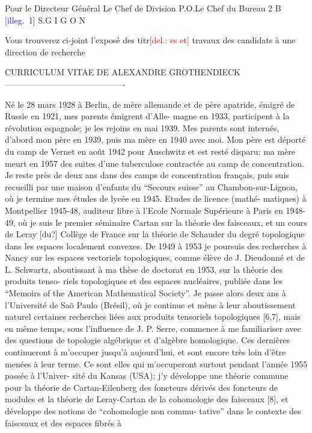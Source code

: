 \documentclass[11pt]{article}
\newcommand{\scanpage}[1]{\par\bigskip\noindent{\small\sffamily[scan #1]}\par}
\newcommand{\mspage}[1]{{\small\sffamily[p.\,#1]}}
\newcommand{\hand}[1]{\textcolor{blue}{#1}}
\newcommand{\deleted}[1]{\textcolor{red}{[\textsf{del.:} #1]}}
\newcommand{\unsure}[1]{[#1?]}
\newcommand{\illegible}[1]{[\textsf{illeg.\ #1}]}
\begin{document}
Pour le Directeur Général
Le Chef de Division
P.O.Le Chef du Bureau 2 B
\hand{\illegible{1}}
S.G I G O N

\mspage{\hand{308}}

\clearpage
\scanpage{119/310}
Vous trouverez ci-joint l'exposé
des titr\deleted{es et} travaux des candidats
à une direction de recherche

CURRICULUM VITAE DE ALEXANDRE GROTHENDIECK
-------------------------------------------

Né le 28 mars 1928 à Berlin, de mère allemande et de père
apatride, émigré de Russie en 1921, mes parents émigrent d'Alle-%
magne en 1933, participent à la révolution espagnole; je les
rejoins en mai 1939. Mes parents sont internés, d'abord mon père
en 1939, puis ma mère en 1940 avec moi. Mon père est déporté du
camp de Vernet en août 1942 pour Auschwitz et est resté disparu;
ma mère meurt en 1957 des suites d'une tuberculose contractée au
camp de concentration. Je reste près de deux ans dans des camps
de concentration français, puis suis recueilli par une maison
d'enfants du ``Secours suisse'' au Chambon-sur-Lignon, où je
termine mes études de lycée en 1945. Etudes de licence (mathé-%
matiques) à Montpellier 1945-48, auditeur libre à l'Ecole Normale
Supérieure à Paris en 1948-49, où je suis le premier séminaire
Cartan sur la théorie des faisceaux, et un cours de Leray \unsure{du}
Collège de France sur la théorie de Schauder du degré topologique
dans les espaces localement convexes. De 1949 à 1953 je poursuis
des recherches à Nancy sur les espaces vectoriels topologiques,
comme élève de J. Dieudonné et de L. Schwartz, aboutissant à ma
thèse de doctorat en 1953, sur la théorie des produits tenso-%
riels topologiques et des espaces nucléaires, publiée dans les
``Memoirs of the American Mathematical Society''. Je passe alors
deux ans à l'Université de Saõ Paulo (Brésil), où je continue
et mène à leur aboutissement naturel certaines recherches liées
aux produits tensoriels topologiques [6,7], mais en même temps,
sous l'influence de J. P. Serre, commence à me familiariser avec
des questions de topologie algébrique et d'algèbre homologique.
Ces dernières continueront à m'occuper jusqu'à aujourd'hui, et
sont encore très loin d'être menées à leur terme. Ce sont elles
qui m'occuperont surtout pendant l'année 1955 passée à l'Univer-%
sité du Kansas (USA); j'y développe une théorie commune pour la
théorie de Cartan-Eilenberg des foncteurs dérivés des foncteurs
de modules et la théorie de Leray-Cartan de la cohomologie des
faisceaux [8], et développe des notions de ``cohomologie non commu-%
tative'' dans le contexte des faisceaux et des espaces fibrés à
\end{document}
